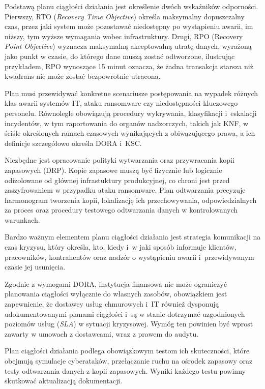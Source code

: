 Podstawą planu ciągłości działania jest określenie dwóch wskaźników odporności. Pierwszy, RTO (\textit{Recovery Time Objective}) określa maksymalny dopuszczalny czas, przez jaki system może pozostawać niedostępny po wystąpieniu awarii, im niższy, tym wyższe wymagania wobec infrastruktury. Drugi, RPO (Recovery\textit{ Point Objective}) wyznacza  maksymalną akceptowalną utratę danych, wyrażoną jako punkt w czasie, do którego dane muszą zostać odtworzone, ilustrując przykładem, RPO wynoszące 15 minut oznacza, że żadna transakcja starsza niż kwadrans nie może zostać bezpowrotnie utracona.

Plan musi przewidywać konkretne scenariusze postępowania na wypadek różnych klas awarii systemów IT, ataku ransomware czy niedostępności kluczowego personelu. Równolegle obowiązują procedury wykrywania, klasyfikacji i~eskalacji incydentów, w tym raportowania do organów nadzorczych, takich jak KNF, w ściśle określonych ramach czasowych wynikających z obiwązującego prawa, a ich definicje szczegółowo określa DORA i~KSC.

Niezbędne jest opracowanie polityki wytwarzania oraz przywracania kopii zapasowych (DRP). Kopie zapasowe muszą być fizycznie lub logicznie odizolowane od głównej infrastuktury produkcyjnej, co chroni jest przed zaszyfrowaniem w przypadku ataku ransomware. Plan odtwarzania precyzuje harmonogram tworzenia kopii, lokalizację ich przechowywania, odpowiedzialnych za proces oraz procedury testowego odtwarzania danych w kontrolowanych warunkach.

Bardzo ważnym elementem planu ciągłości działania jest strategia komunikacji na czas kryzysu, który określa, kto, kiedy i~w jaki sposób informuje klientów, pracowników, kontrahentów oraz nadzór o wystąpieniu awarii i~przewidywanym czasie jej usunięcia. 

Zgodnie z wymogami DORA, instytucja finansowa nie może ograniczyć planowania ciągłości wyłącznie do własnych zasobów, obowiązkiem jest zapewnienie, że dostawcy usług chmurowych i~IT również dysponują udokumentowanymi planami ciągłości i~są w stanie dotrzymać uzgodnionych poziomów usług (\textit{SLA}) w sytuacji kryzysowej. Wymóg ten powinien być wprost zawarty w umowach z dostawcami, wraz z prawem do audytu.

Plan ciągłości działania podlega obowiązkowym testom ich skuteczności, które obejmują symulacje cyberataków, przełączanie ruchu na ośrodek zapasowy oraz testy odtwarzania danych z kopii zapasowych. Wyniki każdego testu powinny skutkować aktualizacją dokumentacji.

